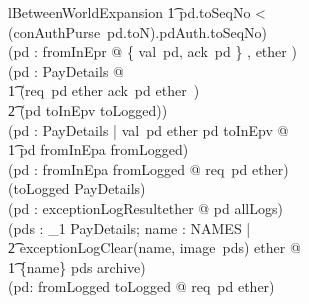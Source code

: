 \begin{LNewLemma}
\begin{theorem}{lBetweenWorldExpansion}
        \t1 pd.toSeqNo < (conAuthPurse~pd.toN).pdAuth.toSeqNo) \\
    \land %
    (\forall pd : fromInEpr @ \disjoint \langle \{ val~pd, ack~pd \} , ether \rangle) \\
    \land %
    (\forall pd : PayDetails @ \\ %
        \t1 (req~pd \in ether \land ack~pd \notin ether~) \\ %
        \t2 \iff (pd \in toInEpv \cup toLogged)) \\
    \land %
    (\forall pd : PayDetails | val~pd \in ether \land pd \in toInEpv @ \\ %
        \t1 pd \in fromInEpa \cup fromLogged) \\
    \land %
    (\forall pd : fromInEpa \cup fromLogged @  req~pd \in ether) \\
    \land %
    (toLogged \in \finset PayDetails) \\
    \land %
    (\forall pd : exceptionLogResult\inv \limg ether \rimg @ pd \in allLogs) \\
    \land %
    (\forall pds : \power_1 PayDetails; name : NAMES | \\ %
            \t2 exceptionLogClear(name, image~pds) \in ether @ \\ %
        \t1 \{name\} \cross pds \subseteq archive) \\
    \land %
    (\forall pd: fromLogged \cup toLogged @ req~pd \in ether)
\end{theorem}~\end{LNewLemma}

